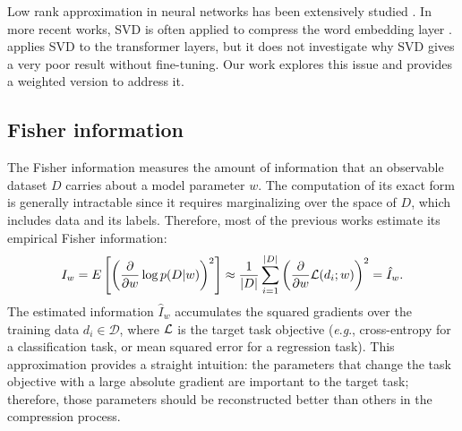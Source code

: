 \documentclass{article} %
\newcommand{\eg}{\textit{e}.\textit{g}.}
\newcommand{\yh}[1]{}
\newcommand{\yh}[1]{{\color{green}{(Yen: #1)}}}
\begin{document}
Low rank approximation in neural networks has been extensively studied \citep{jaderberg2014speeding,zhang2015accelerating,denton2014exploiting}. In more recent works, SVD is often applied to compress the word embedding layer \citep{chen2018groupreduce, acharya2019online}. \cite{noach2020compressing} applies SVD to the transformer layers, but it does not investigate why SVD gives a very poor result without fine-tuning. Our work explores this issue and provides a weighted version to address it. 



\subsection{Fisher information}
The Fisher information measures the amount of information that an observable dataset $D$ carries about a model parameter $w$. The computation of its exact form is generally intractable since it requires marginalizing over the space of $D$, which includes data and its labels. 
Therefore, most of the previous works estimate its empirical Fisher information:
\begin{equation}
    I_w =E\left[\left(\frac{\partial}{{\partial w }} \log p(D|w )\right)^2\right] \approx \frac{1}{|D|}\sum\limits_{i = 1}^{|D|} {\left( {\frac{\partial }{{\partial w }}{\mathcal{L}}(d_i;w)} \right)^2}={\hat I_w}.
    \label{equ:empirical_fisher}
\end{equation}
The estimated information $\hat I_w$ accumulates the squared gradients over the training data $d_i \in \mathcal{D}$, where ${\mathcal{L}}$ is the target task objective (\eg, cross-entropy for a classification task, or mean squared error for a regression task). This approximation provides a straight intuition: the parameters that change the task objective with a large absolute gradient are important to the target task; therefore, those parameters should be reconstructed better than others in the compression process.
\end{document}
